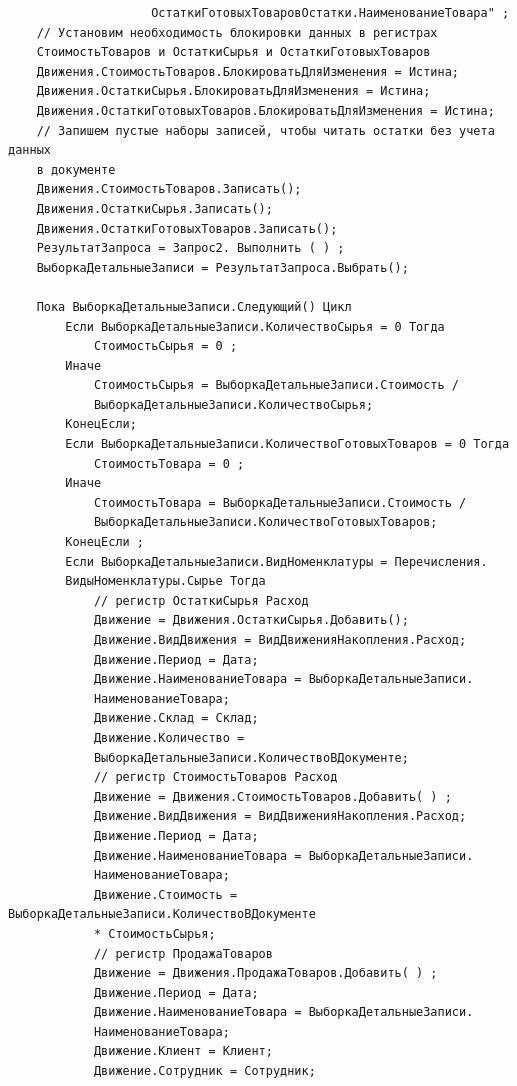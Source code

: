\documentclass[12pt,a4paper]{article}
\begin{document}
\begin{appendices}
\begin{verbatim}
                    ОстаткиГотовыхТоваровОстатки.НаименованиеТовара" ;
    // Установим необходимость блокировки данных в регистрах
    СтоимостьТоваров и ОстаткиСырья и ОстаткиГотовыхТоваров
    Движения.СтоимостьТоваров.БлокироватьДляИзменения = Истина;
    Движения.ОстаткиСырья.БлокироватьДляИзменения = Истина;
    Движения.ОстаткиГотовыхТоваров.БлокироватьДляИзменения = Истина;
    // Запишем пустые наборы записей, чтобы читать остатки без учета данных
    в документе
    Движения.СтоимостьТоваров.Записать();
    Движения.ОстаткиСырья.Записать();
    Движения.ОстаткиГотовыхТоваров.Записать();
    РезультатЗапроса = Запрос2. Выполнить ( ) ;
    ВыборкаДетальныеЗаписи = РезультатЗапроса.Выбрать();
	
    Пока ВыборкаДетальныеЗаписи.Следующий() Цикл  
        Если ВыборкаДетальныеЗаписи.КоличествоСырья = 0 Тогда
            СтоимостьСырья = 0 ;
        Иначе
            СтоимостьСырья = ВыборкаДетальныеЗаписи.Стоимость /
            ВыборкаДетальныеЗаписи.КоличествоСырья;	
        КонецЕсли;
        Если ВыборкаДетальныеЗаписи.КоличествоГотовыхТоваров = 0 Тогда
            СтоимостьТовара = 0 ;
        Иначе    
            СтоимостьТовара = ВыборкаДетальныеЗаписи.Стоимость /
            ВыборкаДетальныеЗаписи.КоличествоГотовыхТоваров;
		КонецЕсли ;                                               
        Если ВыборкаДетальныеЗаписи.ВидНоменклатуры = Перечисления.
        ВидыНоменклатуры.Сырье Тогда   
            // регистр ОстаткиСырья Расход
            Движение = Движения.ОстаткиСырья.Добавить();
            Движение.ВидДвижения = ВидДвиженияНакопления.Расход;
            Движение.Период = Дата;
            Движение.НаименованиеТовара = ВыборкаДетальныеЗаписи.
            НаименованиеТовара;
            Движение.Склад = Склад;
            Движение.Количество =
            ВыборкаДетальныеЗаписи.КоличествоВДокументе; 
            // регистр СтоимостьТоваров Расход
            Движение = Движения.СтоимостьТоваров.Добавить( ) ;
            Движение.ВидДвижения = ВидДвиженияНакопления.Расход;
            Движение.Период = Дата;
            Движение.НаименованиеТовара = ВыборкаДетальныеЗаписи.
            НаименованиеТовара;
            Движение.Стоимость = ВыборкаДетальныеЗаписи.КоличествоВДокументе
            * СтоимостьСырья;
            // регистр ПродажаТоваров		
            Движение = Движения.ПродажаТоваров.Добавить( ) ;
            Движение.Период = Дата;
            Движение.НаименованиеТовара = ВыборкаДетальныеЗаписи.
            НаименованиеТовара;
            Движение.Клиент = Клиент;
            Движение.Сотрудник = Сотрудник;

\end{verbatim}
\end{appendices}
\end{document}
